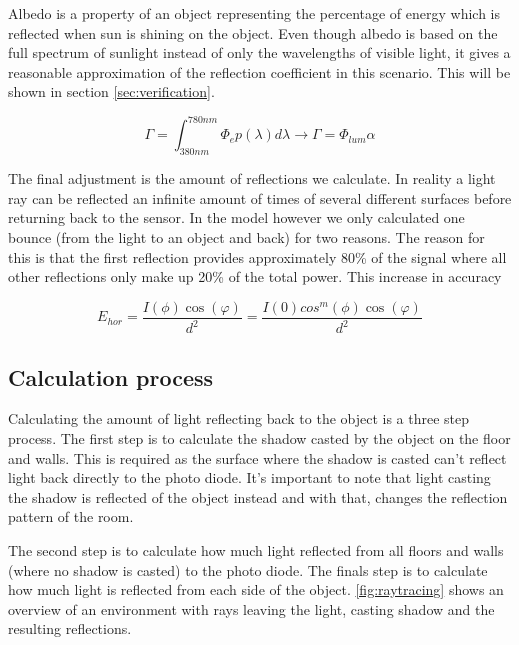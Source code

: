 Albedo is a property of an object representing the percentage of energy which is reflected when sun is shining on the object. Even though albedo is based on the full spectrum of sunlight instead of only the wavelengths of visible light, it gives a reasonable approximation of the reflection coefficient in this scenario. This will be shown in section \ref{sec:verification}.

\begin{equation}
\Gamma = \int_{380nm}^{780nm} \Phi_e p(\lambda) d\lambda \to \Gamma = \Phi_{lum} \alpha
\end{equation}

The final adjustment is the amount of reflections we calculate. In reality a light ray can be reflected an infinite amount of times of several different surfaces before returning back to the sensor. In the model however we only calculated one bounce (from the light to an object and back) for two reasons. The reason for this is that the first reflection provides approximately 80\% of the signal where all other reflections only make up 20\% of the total power\cite{indoor_VLC_no_LOS}. This increase in accuracy

\begin{equation}
\label{eq:Ehor_new}
E_{hor}=\frac{I(\phi)\cos(\varphi)}{d^2}=\frac{I(0) cos^m(\phi)\cos(\varphi)}{d^2}
\end{equation}

\subsection{Calculation process}
Calculating the amount of light reflecting back to the object is a three step process. The first step is to calculate the shadow casted by the object on the floor and walls. This is required as the surface where the shadow is casted can't reflect light back directly to the photo diode. It's important to note that light casting the shadow is reflected of the object instead and with that, changes the reflection pattern of the room.

The second step is to calculate how much light reflected from all floors and walls (where no shadow is casted) to the photo diode. The finals step is to calculate how much light is reflected from each side of the object. \ref{fig:raytracing} shows an overview of an environment with rays leaving the light, casting shadow and the resulting reflections.

